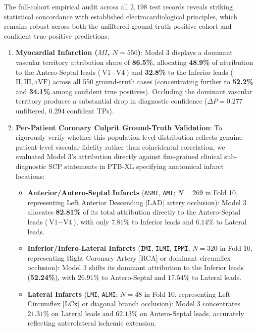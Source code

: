 \documentclass[12pt]{elsarticle}
\begin{document}
The full-cohort empirical audit across all $2,198$ test records reveals striking statistical concordance with established electrocardiological principles, which remains robust across both the unfiltered ground-truth positive cohort and confident true-positive predictions:
\begin{enumerate}
    \item \textbf{Myocardial Infarction ($MI$, $N=550$)}: Model 3 displays a dominant vascular territory attribution share of \textbf{86.5\%}, allocating \textbf{48.9\%} of attribution to the Antero-Septal leads ($\text{V1}-\text{V4}$) and \textbf{32.8\%} to the Inferior leads ($\text{II}, \text{III}, \text{aVF}$) across all 550 ground-truth cases (concentrating further to \textbf{52.2\%} and \textbf{34.1\%} among confident true positives). Occluding the dominant vascular territory produces a substantial drop in diagnostic confidence ($\Delta P = 0.277$ unfiltered, $0.294$ confident TPs).
    \item \textbf{Per-Patient Coronary Culprit Ground-Truth Validation}: To rigorously verify whether this population-level distribution reflects genuine patient-level vascular fidelity rather than coincidental correlation, we evaluated Model 3's attribution directly against fine-grained clinical sub-diagnostic SCP statements in PTB-XL specifying anatomical infarct locations:
    \begin{itemize}
        \item \textbf{Anterior/Antero-Septal Infarcts} (\texttt{ASMI}, \texttt{AMI}; $N=269$ in Fold 10, representing Left Anterior Descending [LAD] artery occlusion): Model 3 allocates \textbf{82.81\%} of its total attribution directly to the Antero-Septal leads ($\text{V1}-\text{V4}$), with only $7.81\%$ to Inferior leads and $6.14\%$ to Lateral leads.
        \item \textbf{Inferior/Infero-Lateral Infarcts} (\texttt{IMI}, \texttt{ILMI}, \texttt{IPMI}; $N=320$ in Fold 10, representing Right Coronary Artery [RCA] or dominant circumflex occlusion): Model 3 shifts its dominant attribution to the Inferior leads (\textbf{52.24\%}), with $26.91\%$ to Antero-Septal and $17.54\%$ to Lateral leads.
        \item \textbf{Lateral Infarcts} (\texttt{LMI}, \texttt{ALMI}; $N=48$ in Fold 10, representing Left Circumflex [LCx] or diagonal branch occlusion): Model 3 concentrates $21.31\%$ on Lateral leads and $62.13\%$ on Antero-Septal leads, accurately reflecting anterolateral ischemic extension.
    \end{itemize}

\end{enumerate}
\end{document}
